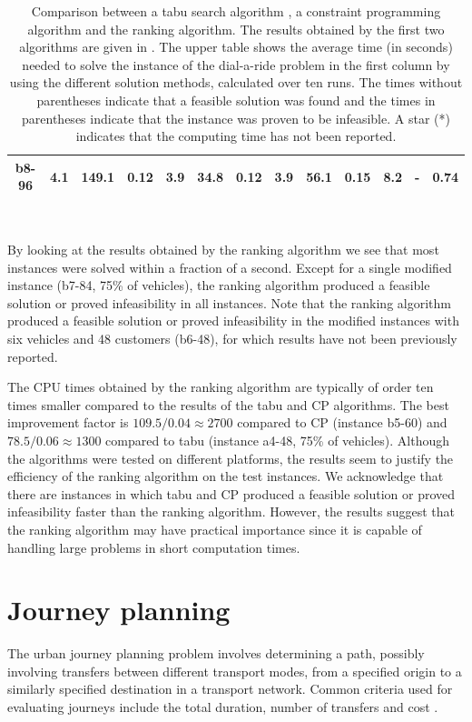 \documentclass[dissertation,draft*]{aaltoseries}
\begin{document}
\begin{table}
{\begin{center}
\begin{tabular}{|c|ccc|ccc|ccc|ccc|}
\hline
b8-96 & 4.1 & 149.1 & 0.12 & 3.9 & 34.8 & 0.12 & 3.9 & 56.1 &0.15& 8.2 & - &0.74 \\ %
\hline
\end{tabular} \\ 
\end{center}
\caption{Comparison between a tabu search algorithm \citep{cordeau02}, 
a constraint programming algorithm \citep{berbegliathesis} and the ranking algorithm.
The results obtained by the first two algorithms are given in \citep{berbegliathesis,berbegliafeas}.
The upper table shows the average time (in seconds) needed to solve the
instance of the dial-a-ride problem in the first column by using the different solution methods,
calculated over ten runs. The times without parentheses indicate that a feasible solution was found and 
the times in parentheses indicate that the instance was proven to be infeasible. A star (*) indicates that 
the computing time has not been reported.
}
\label{comparisontable}
}
\end{table}

By looking at the results obtained by the ranking algorithm we see that most instances
were solved within a fraction of a second. 
Except for a single modified instance (b7-84, 75\% of vehicles), the 
ranking algorithm produced a feasible solution or proved infeasibility in all instances.
Note that the ranking algorithm produced a feasible solution or proved infeasibility in 
the modified instances with six vehicles and 48 customers (b6-48), for which results have not been previously reported.

The CPU times obtained by the ranking algorithm are 
typically of order ten times smaller
compared to the results of the tabu and CP algorithms. 
The best improvement factor is 
$109.5 / 0.04 \approx 2 700$ compared to CP (instance b5-60)
and $78.5/0.06 \approx 1300$ compared to tabu (instance a4-48, 75\% of vehicles).
Although the algorithms
were tested on different platforms, the results seem to justify the efficiency of the 
ranking algorithm on the test instances. We acknowledge that 
there are instances in which tabu and CP produced a feasible solution or 
proved infeasibility faster than the ranking algorithm.
However, the results suggest that the ranking algorithm may have practical importance
since it is capable of handling large problems in short computation times.



\chapter{Journey planning}
\label{journeyplanning}
The urban journey planning problem involves
determining a path, possibly involving transfers between different transport modes, 
from a specified origin to a similarly specified destination 
in a transport network. Common criteria used for evaluating journeys
include the total duration, number of transfers and cost \cite{androutsopoulos, 
zografos,peng,modesti,huang, huang2, horn2003, tong, tong2, ziliaskopoulos, 
berube, cooke, cai, chabini, kostreva, hamacher, bander,tan}.
\end{document}
